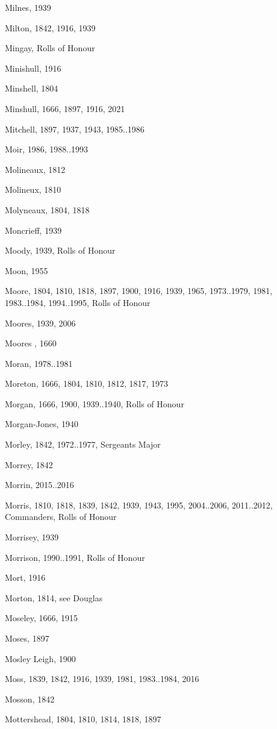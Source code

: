 {\begin{theindex}
\item Milnes, 1939
\item Milton, 1842, 1916, 1939
\item Mingay, Rolls of Honour
\item Minishull, 1916
\item Minshell, 1804
\item Minshull, 1666, 1897, 1916, 2021
\item Mitchell, 1897, 1937, 1943, 1985..1986
\item Moir, 1986, 1988..1993
\item Molineaux, 1812
\item Molineux, 1810
\item Molyneaux, 1804, 1818
\item Moncrieff, 1939
\item Moody, 1939, Rolls of Honour
\item Moon, 1955
\item Moore, 1804, 1810, 1818, 1897, 1900, 1916, 1939, 1965, 1973..1979, 1981, 1983..1984, 1994..1995, Rolls of Honour
\item Moores, 1939, 2006
\item Moores , 1660
\item Moran, 1978..1981
\item Moreton, 1666, 1804, 1810, 1812, 1817, 1973
\item Morgan, 1666, 1900, 1939..1940, Rolls of Honour
\item Morgan-Jones, 1940
\item Morley, 1842, 1972..1977, Sergeants Major
\item Morrey, 1842
\item Morrin, 2015..2016
\item Morris, 1810, 1818, 1839, 1842, 1939, 1943, 1995, 2004..2006, 2011..2012, Commanders, Rolls of Honour
\item Morrisey, 1939
\item Morrison, 1990..1991, Rolls of Honour
\item Mort, 1916
\item Morton, 1814, see Douglas
\item Moseley, 1666, 1915
\item Moses, 1897
\item Mosley Leigh, 1900
\item Moss, 1839, 1842, 1916, 1939, 1981, 1983..1984, 2016
\item Mosson, 1842
\item Mottershead, 1804, 1810, 1814, 1818, 1897

\end{theindex}}
